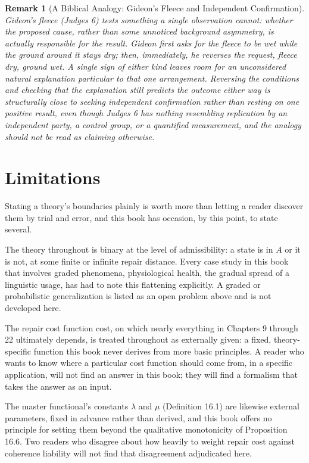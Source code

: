 \documentclass[11pt]{book}
\newtheorem*{appendixremark}{Remark}
\begin{document}
\begin{appendixremark}[A Biblical Analogy: Gideon's Fleece and Independent Confirmation]
Gideon's fleece (Judges 6) tests something a single observation cannot: whether the proposed cause, rather than some unnoticed background asymmetry, is actually responsible for the result. Gideon first asks for the fleece to be wet while the ground around it stays dry; then, immediately, he reverses the request, fleece dry, ground wet. A single sign of either kind leaves room for an unconsidered natural explanation particular to that one arrangement. Reversing the conditions and checking that the explanation still predicts the outcome either way is structurally close to seeking independent confirmation rather than resting on one positive result, even though Judges 6 has nothing resembling replication by an independent party, a control group, or a quantified measurement, and the analogy should not be read as claiming otherwise.
\end{appendixremark}

\chapter*{Limitations}

Stating a theory's boundaries plainly is worth more than letting a reader discover them by trial and error, and this book has occasion, by this point, to state several.

The theory throughout is binary at the level of admissibility: a state is in $A$ or it is not, at some finite or infinite repair distance. Every case study in this book that involves graded phenomena, physiological health, the gradual spread of a linguistic usage, has had to note this flattening explicitly. A graded or probabilistic generalization is listed as an open problem above and is not developed here.

The repair cost function $\mathrm{cost}$, on which nearly everything in Chapters 9 through 22 ultimately depends, is treated throughout as externally given: a fixed, theory-specific function this book never derives from more basic principles. A reader who wants to know where a particular cost function should come from, in a specific application, will not find an answer in this book; they will find a formalism that takes the answer as an input.

The master functional's constants $\lambda$ and $\mu$ (Definition 16.1) are likewise external parameters, fixed in advance rather than derived, and this book offers no principle for setting them beyond the qualitative monotonicity of Proposition 16.6. Two readers who disagree about how heavily to weight repair cost against coherence liability will not find that disagreement adjudicated here.
\end{document}
